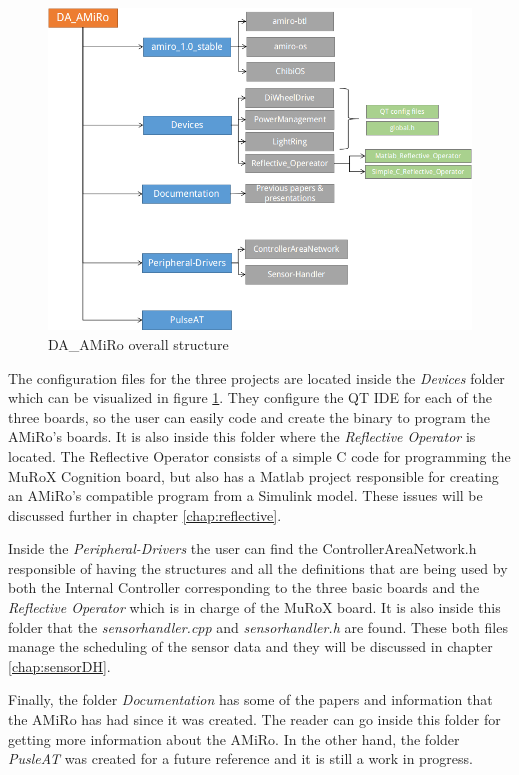 \documentclass[12pt]{report}%
\begin{document}
\begin{figure}[ht]
	\centering
	\includegraphics[width=\textwidth]{DAAMIRO}
    \caption{DA\_AMiRo overall structure}
    \label{fig:DAAMIROstr}
\end{figure}

The configuration files for the three projects are located inside the \textit{Devices} folder which can be visualized in figure \ref{fig:DAAMIROstr}. They configure the QT IDE for each of the three boards, so the user can easily code and create the binary to program the AMiRo's boards. It is also inside this folder where the \textit{Reflective Operator} is located. The Reflective Operator consists of a simple C code for programming the MuRoX Cognition board, but also has a Matlab project responsible for creating an AMiRo's compatible program from a Simulink model. These issues will be discussed further in chapter \ref{chap:reflective}.

Inside the \textit{Peripheral-Drivers} the user can find the ControllerAreaNetwork.h responsible of having the structures and all the definitions that are being used by both the Internal Controller corresponding to the three basic boards and the \textit{Reflective Operator} which is in charge of the MuRoX board. It is also inside this folder that the \textit{sensorhandler.cpp} and \textit{sensorhandler.h} are found. These both files manage the scheduling of the sensor data and they will be discussed in chapter \ref{chap:sensorDH}.

Finally, the folder \textit{Documentation} has some of the papers and information that the AMiRo has had since it was created. The reader can go inside this folder for getting more information about the AMiRo. In the other hand, the folder \textit{PusleAT} was created for a future reference and it is still a work in progress.
\end{document}
